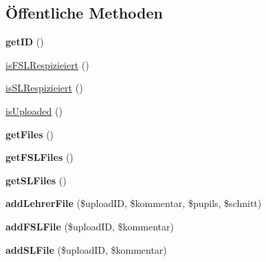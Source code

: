 \subsection*{Öffentliche Methoden}
\begin{DoxyCompactItemize}
\item 
\mbox{\label{class_leistungsnachweis_respizienz_a2069dd688ceb43f7a50ff850118d9163}} 
{\bfseries get\+ID} ()
\item 
\mbox{\hyperlink{class_leistungsnachweis_respizienz_a258526da29342b931f76c5bb39b2dce4}{is\+F\+S\+L\+Respizieiert}} ()
\item 
\mbox{\hyperlink{class_leistungsnachweis_respizienz_a0df1cbc29199d94df60a680eb7c96aff}{is\+S\+L\+Respizieiert}} ()
\item 
\mbox{\hyperlink{class_leistungsnachweis_respizienz_afb1b0322ac6745229e3266e0415ea608}{is\+Uploaded}} ()
\item 
\mbox{\label{class_leistungsnachweis_respizienz_a8519aed172ab4b307eeb6ec7f6e03dae}} 
{\bfseries get\+Files} ()
\item 
\mbox{\label{class_leistungsnachweis_respizienz_a5f8797efff511c42a342dc6b3d21d615}} 
{\bfseries get\+F\+S\+L\+Files} ()
\item 
\mbox{\label{class_leistungsnachweis_respizienz_ad20aa1e60aa3ee89ccc46fb4576d0ddf}} 
{\bfseries get\+S\+L\+Files} ()
\item 
\mbox{\label{class_leistungsnachweis_respizienz_aa8284d62bfa6c6673d3fcbc077371b63}} 
{\bfseries add\+Lehrer\+File} (\$upload\+ID, \$kommentar, \$pupils, \$schnitt)
\item 
\mbox{\label{class_leistungsnachweis_respizienz_a2ea388ebe8a39103a367c2354ca46988}} 
{\bfseries add\+F\+S\+L\+File} (\$upload\+ID, \$kommentar)
\item 
\mbox{\label{class_leistungsnachweis_respizienz_ae293ed2d5526edffe19fd9e5fa816349}} 
{\bfseries add\+S\+L\+File} (\$upload\+ID, \$kommentar)
\item 
\mbox{\label{class_leistungsnachweis_respizienz_aba797460db952130a5661b326d990b8d}} 

\end{DoxyCompactItemize}
